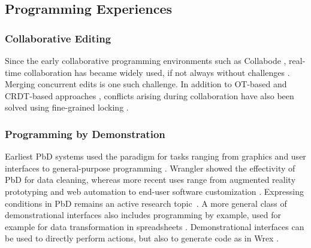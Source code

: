 \documentclass[sigconf]{acmart}
\begin{document}

\subsection{Programming Experiences}
\label{sec:background-exp}


\subsubsection*{Collaborative Editing}
Since the early collaborative programming environments such as Collabode \cite{goldman-2011-collaborative},
real-time collaboration has became widely used, if not always without challenges \cite{tan-2024-vslive}.
Merging concurrent edits is one such challenge. In addition to OT-based and CRDT-based
approaches \cite{klokmose-2024-mywebstrates}, conflicts arising during
collaboration have also been solved using fine-grained locking \cite{wang-2024-nbconflicts}.

\subsubsection*{Programming by Demonstration}
Earliest PbD systems used the paradigm for tasks ranging from graphics
and user interfaces to general-purpose programming \cite{smith-1975-pygmalion,cypher-1993-pbd}.
Wrangler \cite{kandel-2011-wrangler} showed the effectivity of PbD for data cleaning,
whereas more recent uses range from augmented reality prototyping \cite{leiva-2021-rapido}
and web automation \cite{chen-2023-miwa} to end-user software customization
\cite{litt-2020-customization,litt-2020-wildcard}. Expressing conditions in PbD remains an
active research topic~\cite{pu-2022-semanticon,radensky-2018-conditionals}. A more general class of demonstrational
interfaces \cite{myers-2000-intelligence} also includes programming by example, used
for example for data transformation in spreadsheets \cite{gulwani-2012-spreadsheets}.
Demonstrational interfaces can be used to directly perform actions, but also to generate code
as in Wrex \cite{drossos-2020-wrex}.
\end{document}
